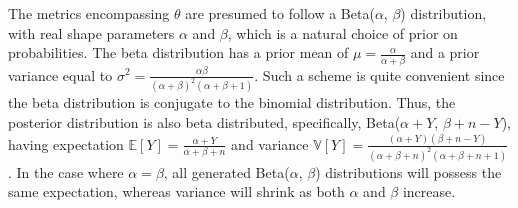 \documentclass[12pt]{article}
\begin{document}
The metrics encompassing $\theta$ are presumed to follow a Beta($\alpha$, $\beta$) distribution, with real shape parameters $\alpha$ and $\beta$, which is a natural choice of prior on probabilities. The beta distribution has a prior mean of $\mu = \frac{\alpha}{\alpha + \beta}$ and a prior variance equal to $\sigma^2 = \frac{\alpha\beta}{(\alpha + \beta)^2(\alpha + \beta + 1)}$. Such a scheme is quite convenient since the beta distribution is conjugate to the binomial distribution. Thus, the posterior distribution is also beta distributed, specifically, Beta($\alpha + Y$, $\beta + n - Y$), having expectation $\mathbb{E}[Y] = \frac{\alpha + Y}{\alpha + \beta + n}$ and variance $\mathbb{V}[Y] = \frac{(\alpha + Y)(\beta + n - Y)}{(\alpha + \beta + n)^2(\alpha + \beta + n + 1)}$. In the case where $\alpha = \beta$, all generated Beta($\alpha$, $\beta$) distributions will possess the same expectation, whereas variance will shrink as both $\alpha$ and $\beta$ increase.
\end{document}
